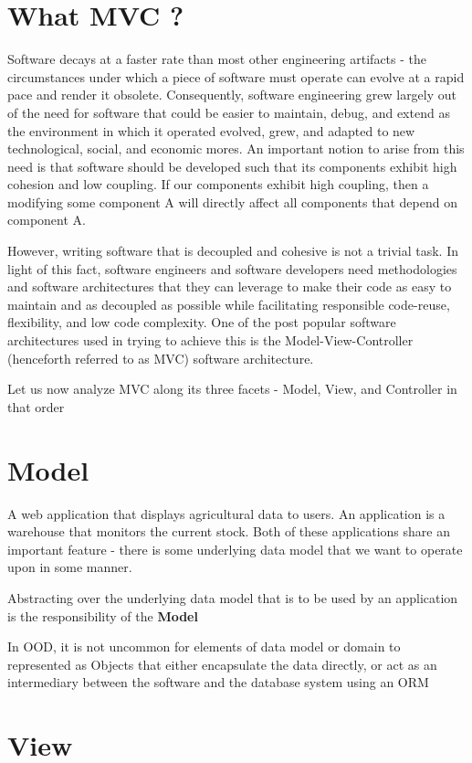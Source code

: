
\section{What MVC ?}

Software decays at a faster rate than most other engineering artifacts - the circumstances under which a piece of software must operate can evolve at a rapid pace and render it obsolete. Consequently, software engineering grew largely out of the need for software that could be easier to maintain, debug, and extend as the environment in which it operated evolved, grew, and adapted to new technological, social, and economic mores. An important notion to arise from this need is that software should be developed such that its components exhibit high cohesion and low coupling. If our components exhibit high coupling, then a modifying some component A will directly affect all components that depend on component A.

However, writing software that is decoupled and cohesive is not a trivial task. In light of this fact, software engineers and software developers need methodologies and software architectures that they can leverage to make their code as easy to maintain and as decoupled as possible  while facilitating responsible code-reuse, flexibility, and low code complexity. One of the post popular software architectures used in trying to achieve this is the Model-View-Controller (henceforth referred to as MVC) software architecture.

Let us now analyze MVC along its three facets - Model, View, and Controller in that order

\section{Model}

A web application that displays agricultural data to users. An application is a warehouse that monitors the current stock. Both of these applications share an important feature - there is some underlying data model that we want to operate upon in some manner. 

Abstracting over the underlying data model that is to be used by an application is the responsibility of the \textbf{Model}

In OOD, it is not uncommon for elements of data model or domain to represented as Objects that either encapsulate the data directly, or act as an intermediary between the software and the database system using an ORM
\section{View}

